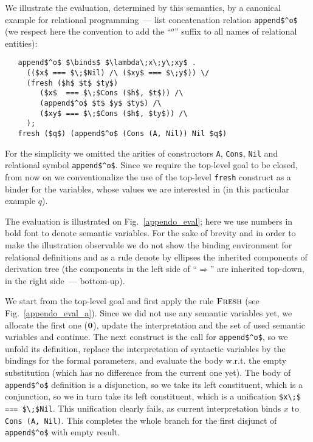 We illustrate the evaluation, determined by this semantics, by a canonical example for relational programming~--- list concatenation relation \lstinline|append$^o$| 
(we respect here the convention to add the ``$^o$'' suffix to all names of relational entities):

\begin{lstlisting}  
   append$^o$ $\binds$ $\lambda\;x\;y\;xy$ . 
     (($x$ === $\;$Nil) /\ ($xy$ === $\;y$)) \/
     (fresh ($h$ $t$ $ty$)
        ($x$  === $\;$Cons ($h$, $t$)) /\
        (append$^o$ $t$ $y$ $ty$) /\
        ($xy$ === $\;$Cons ($h$, $ty$)) /\
     );
   fresh ($q$) (append$^o$ (Cons (A, Nil)) Nil $q$)
\end{lstlisting}

For the simplicity we omitted the arities of constructors \lstinline|A|, \lstinline|Cons|, \lstinline|Nil| and relational symbol \lstinline|append$^o$|. Since we require the 
top-level goal to be closed, from now on we conventionalize the use of the top-level \lstinline|fresh| construct as a binder for the variables, whose values we are 
interested in (in this particular example $q$).

The evaluation is illustrated on Fig.~\ref{appendo_eval}; here we use numbers in bold font to denote semantic variables. For the sake of brevity and in order to
make the illustration observable we do not show the binding environment for relational definitions and as a rule denote by ellipses the inherited components
of derivation tree (the components in the left side of ``$\Rightarrow$'' are inherited top-down, in the right side~--- bottom-up).

\FloatBarrier
We start from the top-level goal and first apply the rule $\textsc{Fresh}$ (see Fig.~\ref{appendo_eval_a}). Since 
we did not use any semantic variables yet, we allocate the first one ($\mbox{\textbf{0}}$), update the interpretation and the set of used semantic variables and continue. The next construct
is the call for \lstinline|append$^o$|, so we unfold its definition, replace the interpretation of syntactic variables by the bindings for the formal parameters, and 
evaluate the body w.r.t. the empty substitution (which has no difference from the current one yet). The body of \lstinline|append$^o$| definition is a disjunction, so we
take its left constituent, which is a conjunction, so we in turn take its left constituent, which is a unification \lstinline|$x\;$ === $\;$Nil|. This unification clearly fails, as
current interpretation binds $x$ to \lstinline|Cons (A, Nil)|. This completes the whole branch for the first disjunct of \lstinline|append$^o$| with empty result.


